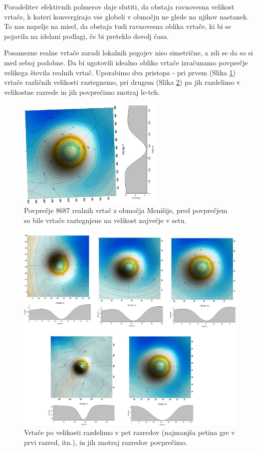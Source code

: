 \documentclass[a4paper, oneside, 12pt]{book}
\begin{document}
Poradelitev efektivnih polmerov daje slutiti, da obstaja ravnovesna velikost vrtače, h kateri konvergirajo vse globeli v območju ne glede na njihov nastanek.
To nas napelje na misel, da obstaja tudi ravnovesna oblika vrtače, ki bi se pojavila na idelani podlagi, če bi preteklo dovolj časa.

Posamezne realne vrtače zaradi lokalnih pogojev niso simetrične, a zdi se da so si med seboj podobne. Da bi ugotovili idealno obliko vrtače izračunamo povprečje velikega števila realnih vrtač. Uporabimo dva pristopa - pri prvem (Slika \ref{fig:menisija-vrtaca}) vrtače različnih velikosti raztegnemo, pri drugem (Slika \ref{fig:menisija-vrtace-po-razredih}) pa jih razdelimo v velikostne razrede in jih povprečimo znotraj le-teh. 

\begin{figure}[H]
  \centering
  \includegraphics[width=7cm]{slike/vrtaca-menisija}
  \caption{Povprečje 8687 realnih vrtač z območja Menišije, pred povprečjem so bile vrtače raztegnjene na velikost največje v setu.}
  \label{fig:menisija-vrtaca}
\end{figure}

\begin{figure}[H]
  \centering
  \includegraphics[width=13cm]{slike/vrtace-po-razredih-menisija}
  \caption{Vrtače po velikosti razdelimo v pet razredov (najmanjša petina gre v prvi razred, itn.), in jih znotraj razredov povprečimo.}
  \label{fig:menisija-vrtace-po-razredih}
\end{figure}
\end{document}
